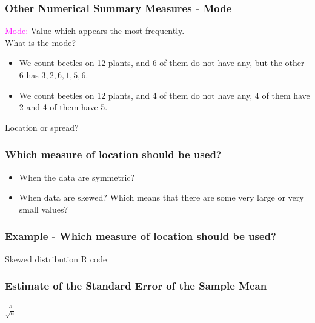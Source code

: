 \documentclass[xcolor=dvipsnames,12pt]{beamer}
\begin{document}
\begin{frame}
\frametitle{Other Numerical Summary Measures - Mode}
\textcolor{magenta}{Mode:} Value which appears the most frequently.\\
What is the mode?
\begin{itemize}
\item We count beetles on 12 plants, and 6 of them do not have any, but the other 6 has $3,2,6,1,5,6$.
\item We count beetles on 12 plants, and 4 of them do not have any, 4 of them have 2 and 4 of them have 5.
\end{itemize}
Location or spread?
\end{frame}

\begin{frame}
\frametitle{Which measure of location should be used?}
\begin{itemize}
\item When the data are symmetric?
\item When data are skewed? Which means that there are some very large or very small values?
\end{itemize}
\end{frame}

\begin{frame}
\frametitle{Example - Which measure of location should be used?}
Skewed distribution R code
\end{frame}

\begin{frame}
\frametitle{Estimate of the Standard Error of the Sample Mean}
$\frac{s}{\sqrt{n}}$
\end{frame}
\end{document}
